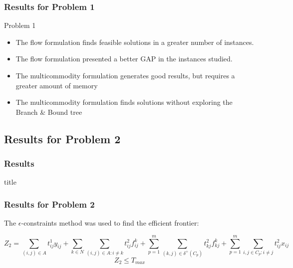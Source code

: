 \documentclass[aspectratio=169]{beamer}
\begin{document}
{\begin{frame}
\frametitle{Results for Problem 1}
\begin{block}{Problem 1}
\begin{itemize}
\item The flow formulation finds feasible solutions in a greater number of instances.
\item The flow formulation presented a better GAP in the instances studied.
\item The multicommodity formulation generates good results, but requires a greater amount of memory
\item The multicommodity formulation finds solutions without exploring the Branch \& Bound tree
\end{itemize}
\end{block}
\end{frame}

\subsection{Results for Problem 2}
\begin{frame}
\frametitle{Results}
  \begin{beamercolorbox}[sep=8pt,center,shadow=true,rounded=true]{title}
  \end{beamercolorbox}
  \vspace{\baselineskip}
\end{frame}

\begin{frame}
\frametitle{Results for Problem 2}
\begin{center}
{\large The $\epsilon$-constraints method was used to find the efficient frontier:}
\end{center}

\begin{equation*}
Z_2 = \sum_{(i,j) \in A} t_{ij}^1 y_{ij} + \sum_{k \in N}\sum_{(i,j) \in A: i \neq k} t_{ij}^2  f_{ij}^k + \sum_{p = 1}^{m} \sum_{(k,j) \in \delta^+(C_{p})} t_{kj}^2 f_{kj}^k + \sum_{p = 1}^{m} \sum_{i,j \in C_p: i \neq j} t_{ij}^2 x_{ij} 
\end{equation*}
\centering{$\Downarrow$}
\begin{equation}
Z_2 \leq T_{max}
\end{equation}
\end{frame}

}
\end{document}
